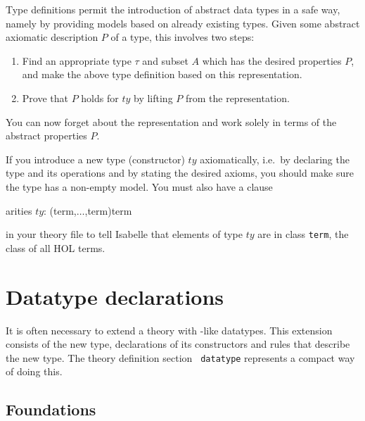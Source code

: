 Type definitions permit the introduction of abstract data types in a safe
way, namely by providing models based on already existing types. Given some
abstract axiomatic description $P$ of a type, this involves two steps:
\begin{enumerate}
\item Find an appropriate type $\tau$ and subset $A$ which has the desired
  properties $P$, and make the above type definition based on this
  representation.
\item Prove that $P$ holds for $ty$ by lifting $P$ from the representation.
\end{enumerate}
You can now forget about the representation and work solely in terms of the
abstract properties $P$.

\begin{warn}
If you introduce a new type (constructor) $ty$ axiomatically, i.e.\ by
declaring the type and its operations and by stating the desired axioms, you
should make sure the type has a non-empty model. You must also have a clause
\par
\begin{ttbox}
arities \(ty\): (term,\(\dots\),term)term
\end{ttbox}
in your theory file to tell Isabelle that elements of type $ty$ are in class
{\tt term}, the class of all HOL terms.
\end{warn}

\section{Datatype declarations}
\label{sec:HOL:datatype}

\underscoreon

It is often necessary to extend a theory with \ML-like datatypes.  This
extension consists of the new type, declarations of its constructors and
rules that describe the new type. The theory definition section {\tt
  datatype} represents a compact way of doing this.


\subsection{Foundations}

